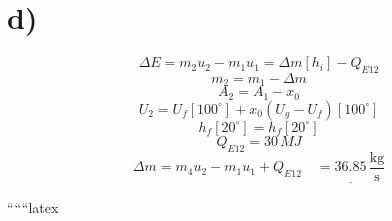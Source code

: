 

\section*{d)}
\[
\Delta E = m_2 u_2 - m_1 u_1 = \Delta m \left[ h_i \right] - Q_{E12}
\]
\[
m_2 = m_1 - \Delta m
\]
\[
A_2 = A_1 - x_0
\]
\[
U_2 = U_f \left[ 100^\circ \right] + x_0 \left( U_g - U_f \right) \left[ 100^\circ \right]
\]
\[
h_f \left[ 20^\circ \right] = h_f \left[ 20^\circ \right]
\]
\[
Q_{E12} = 30 \, MJ
\]
\[
\Delta m = m_4 u_2 - m_1 u_1 + Q_{E12} \quad \underline{= 36.85 \, \frac{\text{kg}}{\text{s}}}
\]

``````latex